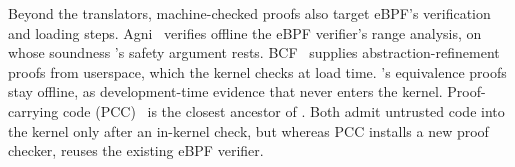 Beyond the translators, machine-checked proofs also target eBPF's verification and loading steps.
Agni~\cite{vishwanathan2023verifying} verifies offline the eBPF verifier's range analysis, on whose soundness \tool's safety argument rests.
BCF~\cite{sun2025prove} supplies abstraction-refinement proofs from userspace, which the kernel checks at load time.
\lang's equivalence proofs stay offline, as development-time evidence that never enters the kernel.
Proof-carrying code (PCC)~\cite{necula1997pcc} is the closest ancestor of \tool.
Both admit untrusted code into the kernel only after an in-kernel check, but whereas PCC installs a new proof checker, \tool reuses the existing eBPF verifier.
